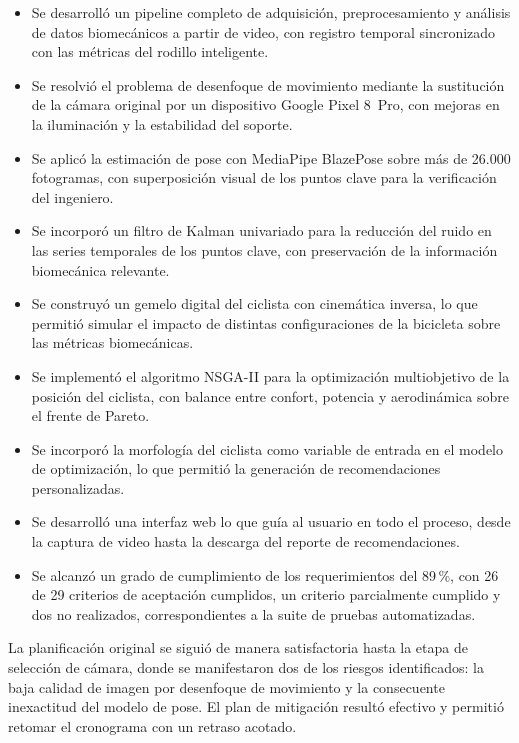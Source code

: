 \begin{itemize}
    \item Se desarrolló un pipeline completo de adquisición, preprocesamiento y análisis
          de datos biomecánicos a partir de video, con registro temporal sincronizado con
          las métricas del rodillo inteligente.
    \item Se resolvió el problema de desenfoque de movimiento mediante la sustitución de
          la cámara original por un dispositivo Google Pixel 8~Pro, con mejoras en la
          iluminación y la estabilidad del soporte.
    \item Se aplicó la estimación de pose con MediaPipe BlazePose sobre más de 26.000
          fotogramas, con superposición visual de los puntos clave para la verificación
          del ingeniero.
    \item Se incorporó un filtro de Kalman univariado para la reducción del ruido en las
          series temporales de los puntos clave, con preservación de la información
          biomecánica relevante.
    \item Se construyó un gemelo digital del ciclista con cinemática inversa, lo que
          permitió simular el impacto de distintas configuraciones de la bicicleta sobre
          las métricas biomecánicas.
    \item Se implementó el algoritmo NSGA-II para la optimización multiobjetivo de la
          posición del ciclista, con balance entre confort, potencia y aerodinámica sobre
          el frente de Pareto.
    \item Se incorporó la morfología del ciclista como variable de entrada en el modelo
          de optimización, lo que permitió la generación de recomendaciones
          personalizadas.
    \item Se desarrolló una interfaz web lo que guía al usuario en todo el proceso, desde
          la captura de video hasta la descarga del reporte de recomendaciones.
    \item Se alcanzó un grado de cumplimiento de los requerimientos del 89\,\%, con 26 de
          29 criterios de aceptación cumplidos, un criterio parcialmente cumplido y dos
          no realizados, correspondientes a la suite de pruebas automatizadas.
\end{itemize}

La planificación original se siguió de manera satisfactoria hasta la etapa de
selección de cámara, donde se manifestaron dos de los riesgos identificados: la
baja calidad de imagen por desenfoque de movimiento y la consecuente
inexactitud del modelo de pose. El plan de mitigación resultó efectivo y
permitió retomar el cronograma con un retraso acotado.

